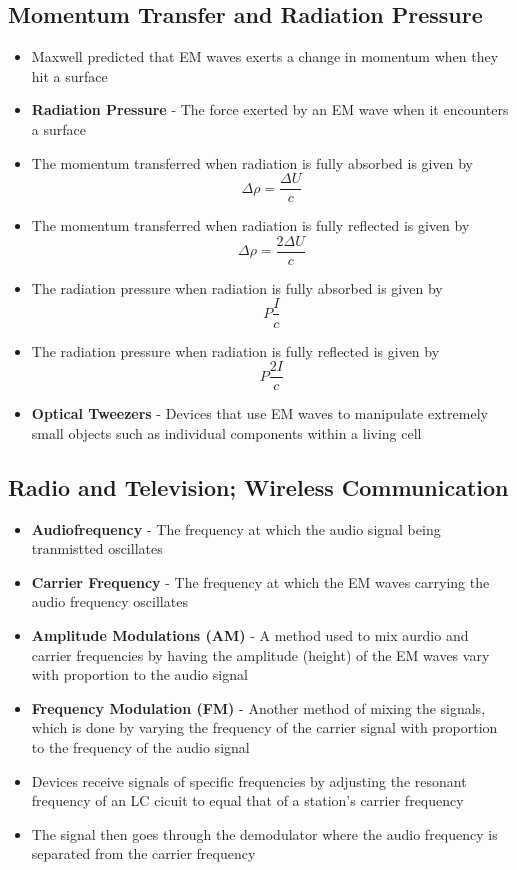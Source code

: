 \subsection{Momentum Transfer and Radiation Pressure}
\begin{itemize}
    \item Maxwell predicted that EM waves exerts a change in momentum when they hit a surface
    \item \textbf{Radiation Pressure} - The force exerted by an EM wave when it encounters a surface
    \item The momentum transferred when radiation is fully absorbed is given by \[\Delta\rho=\frac{\Delta U}{c}\]
    \item The momentum transferred when radiation is fully reflected is given by \[\Delta\rho=\frac{2\Delta U}{c}\]
    \item The radiation pressure when radiation is fully absorbed is given by
    \[P\frac{I}{c}\]
    \item The radiation pressure when radiation is fully reflected is given by
    \[P\frac{2I}{c}\]
    \item \textbf{Optical Tweezers} - Devices that use EM waves to manipulate extremely small objects such as individual components within a living cell
\end{itemize}

\subsection{Radio and Television; Wireless Communication}
\begin{itemize}
    \item \textbf{Audiofrequency} - The frequency at which the audio signal being tranmistted oscillates
    \item \textbf{Carrier Frequency} - The frequency at which the EM waves carrying the audio frequency oscillates
    \item \textbf{Amplitude Modulations (AM)} - A method used to mix aurdio and carrier frequencies by having the amplitude  (height) of the EM waves vary with proportion to the audio signal
    \item \textbf{Frequency Modulation (FM)} - Another method of mixing the signals, which is done by varying the frequency of the carrier signal with proportion to the frequency of the audio signal
    \item Devices receive signals of specific frequencies by adjusting the resonant frequency of an LC cicuit to equal that of a station's carrier frequency
    \item The signal then goes through the demodulator where the audio frequency is separated from the carrier frequency
\end{itemize}

